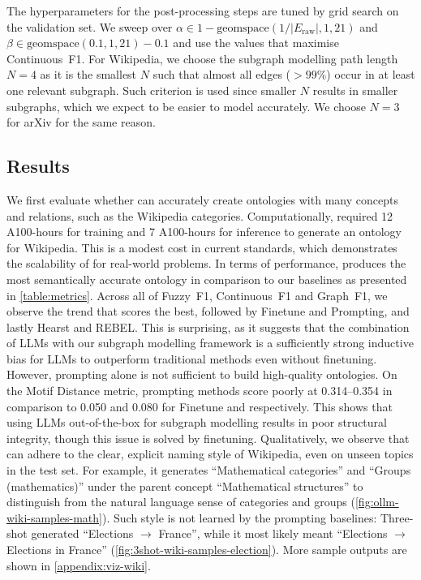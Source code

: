 The hyperparameters for the post-processing steps are tuned by grid search on the validation set. We sweep over $\alpha \in 1 - \text{geomspace}(1 / |E_\text{raw}|, 1, 21)$ and $\beta \in \text{geomspace}(0.1, 1, 21) - 0.1$ and use the values that maximise Continuous~F1. For Wikipedia, we choose the subgraph modelling path length $N=4$ as it is the smallest $N$ such that almost all edges ($>99\%$) occur in at least one relevant subgraph. Such criterion is used since smaller $N$ results in smaller subgraphs, which we expect to be easier to model accurately. We choose $N=3$ for arXiv for the same reason.


\subsection{Results}  \label{sec:results}



We first evaluate whether \name can accurately create ontologies with many concepts and relations, such as the Wikipedia categories. Computationally, \name required 12 A100-hours for training and 7 A100-hours for inference to generate an ontology for Wikipedia. This is a modest cost in current standards, which demonstrates the scalability of \name for real-world problems.
In terms of performance, \name produces the most semantically accurate ontology in comparison to our baselines as presented in \cref{table:metrics}. Across all of Fuzzy~F1, Continuous~F1 and Graph~F1, we observe the trend that \name scores the best, followed by Finetune and Prompting, and lastly Hearst and REBEL. This is surprising, as it suggests that the combination of LLMs with our subgraph modelling framework is a sufficiently strong inductive bias for LLMs to outperform traditional methods even without finetuning. However, prompting alone is not sufficient to build high-quality ontologies.
On the Motif Distance metric, prompting methods score poorly at 0.314--0.354 in comparison to 0.050 and 0.080 for Finetune and \name respectively. This shows that using LLMs out-of-the-box for subgraph modelling results in poor structural integrity, though this issue is solved by finetuning.
Qualitatively, we observe that \name can adhere to the clear, explicit naming style of Wikipedia, even on unseen topics in the test set. For example, it generates ``Mathematical categories'' and ``Groups (mathematics)'' under the parent concept ``Mathematical structures'' to distinguish from the natural language sense of categories and groups (\cref{fig:ollm-wiki-samples-math}). Such style is not learned by the prompting baselines: Three-shot generated ``Elections $\to$ France'', while it most likely meant ``Elections $\to$ Elections in France'' (\cref{fig:3shot-wiki-samples-election}). More sample outputs are shown in \cref{appendix:viz-wiki}.

